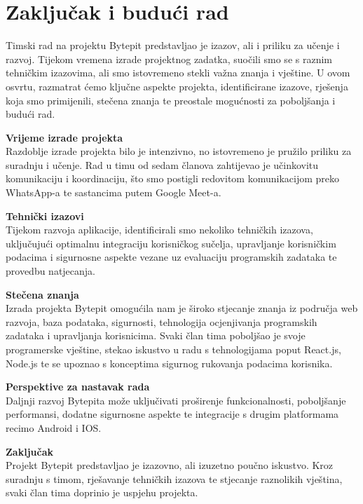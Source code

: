 \chapter{Zaključak i budući rad}
		
		
		Timski rad na projektu Bytepit predstavljao je izazov, ali i priliku za učenje i razvoj. Tijekom vremena izrade projektnog zadatka, suočili smo se s raznim tehničkim izazovima, ali smo istovremeno stekli važna znanja i vještine. U ovom osvrtu, razmatrat ćemo ključne aspekte projekta, identificirane izazove, rješenja koja smo primijenili, stečena znanja te preostale mogućnosti za poboljšanja i budući rad.
		
		\textbf{Vrijeme izrade projekta}\\
		Razdoblje izrade projekta bilo je intenzivno, no istovremeno je pružilo priliku za suradnju i učenje. Rad u timu od sedam članova zahtijevao je učinkovitu komunikaciju i koordinaciju, što smo postigli redovitom komunikacijom preko WhatsApp-a te sastancima putem Google Meet-a.
		
		\textbf{Tehnički izazovi}\\
		Tijekom razvoja aplikacije, identificirali smo nekoliko tehničkih izazova, uključujući optimalnu integraciju korisničkog sučelja, upravljanje korisničkim podacima i sigurnosne aspekte vezane uz evaluaciju programskih zadataka te provedbu natjecanja.
		
		\textbf{Stečena znanja}\\
		Izrada projekta Bytepit omogućila nam je široko stjecanje znanja iz područja web razvoja, baza podataka, sigurnosti, tehnologija ocjenjivanja programskih zadataka i upravljanja korisnicima. Svaki član tima poboljšao je svoje programerske vještine, stekao iskustvo u radu s tehnologijama poput React.js, Node.js te se upoznao s konceptima sigurnog rukovanja podacima korisnika.
		
		\textbf{Perspektive za nastavak rada}\\
		Daljnji razvoj Bytepita može uključivati proširenje funkcionalnosti, poboljšanje performansi, dodatne sigurnosne aspekte te integracije s drugim platformama recimo Android i IOS.
		
		\textbf{Zaključak}\\
		Projekt Bytepit predstavljao je izazovno, ali izuzetno poučno iskustvo. Kroz suradnju s timom, rješavanje tehničkih izazova te stjecanje raznolikih vještina, svaki član tima doprinio je uspjehu projekta. 
	